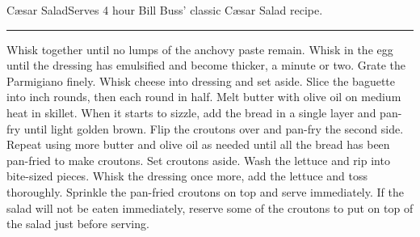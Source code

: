 \begin{recipe}{C\ae{}sar Salad}{Serves 4}{ hour}
\freeform Bill Buss' classic C\ae{}sar Salad recipe.\\
\rule{\textwidth}{0.05pt}
Whisk together until no lumps of the anchovy paste remain.
Whisk in the egg until the dressing has emulsified and become thicker, a minute or two.
Grate the Parmigiano finely. Whisk cheese into dressing and set aside.
Slice the baguette into  inch rounds, then each round in half.
Melt butter with olive oil on medium heat in skillet. When it starts to sizzle, add the bread in a single layer and pan-fry until light golden brown. Flip the croutons over and pan-fry the second side. Repeat using more butter and olive oil as needed until all the bread has been pan-fried to make croutons. Set croutons aside.
Wash the lettuce and rip into bite-sized pieces. Whisk the dressing once more, add the lettuce and toss thoroughly. Sprinkle the pan-fried croutons on top and serve immediately. 
\freeform If the salad will not be eaten immediately, reserve some of the croutons to put on top of the salad just before serving.
\end{recipe}
